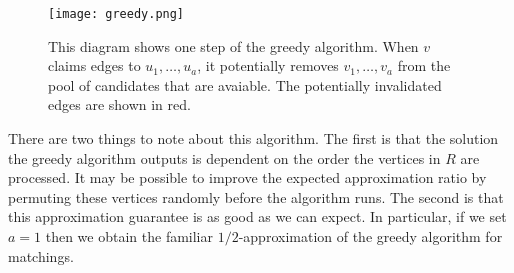 \begin{figure}[h]
\centering
\texttt{[image: greedy.png]}
\begin{minipage}[h]{.8\linewidth}
\caption{This diagram shows one step of the greedy algorithm. When $v$ claims edges to $u_1,\ldots, u_a$, it potentially removes $v_1,\ldots, v_a$ from the pool of candidates that are avaiable. The potentially invalidated edges are shown in red.}
\end{minipage}
\end{figure}

There are two things to note about this algorithm. The first is
that the solution the greedy algorithm outputs is dependent on the
order the vertices in $R$ are processed. It may be possible to improve
the expected approximation ratio by permuting these vertices randomly
before the algorithm runs. The second is that this approximation
guarantee is as good as we can expect. In particular, if we set $a=1$
then we obtain the familiar $1/2$-approximation of the greedy
algorithm for matchings.



